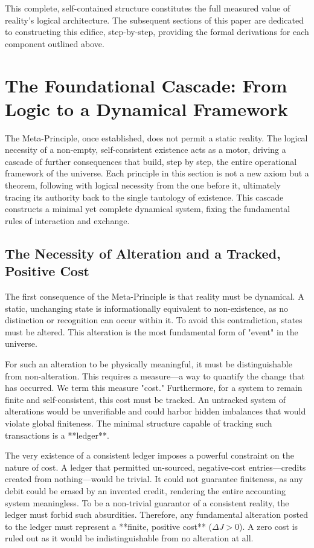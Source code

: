 This complete, self-contained structure constitutes the full measured value of reality's logical architecture. The subsequent sections of this paper are dedicated to constructing this edifice, step-by-step, providing the formal derivations for each component outlined above.

\section{The Foundational Cascade: From Logic to a Dynamical Framework}

The Meta-Principle, once established, does not permit a static reality. The logical necessity of a non-empty, self-consistent existence acts as a motor, driving a cascade of further consequences that build, step by step, the entire operational framework of the universe. Each principle in this section is not a new axiom but a theorem, following with logical necessity from the one before it, ultimately tracing its authority back to the single tautology of existence. This cascade constructs a minimal yet complete dynamical system, fixing the fundamental rules of interaction and exchange.

\subsection{The Necessity of Alteration and a Tracked, Positive Cost}
The first consequence of the Meta-Principle is that reality must be dynamical. A static, unchanging state is informationally equivalent to non-existence, as no distinction or recognition can occur within it. To avoid this contradiction, states must be altered. This alteration is the most fundamental form of "event" in the universe.

For such an alteration to be physically meaningful, it must be distinguishable from non-alteration. This requires a measure—a way to quantify the change that has occurred. We term this measure "cost." Furthermore, for a system to remain finite and self-consistent, this cost must be tracked. An untracked system of alterations would be unverifiable and could harbor hidden imbalances that would violate global finiteness. The minimal structure capable of tracking such transactions is a **ledger**.

The very existence of a consistent ledger imposes a powerful constraint on the nature of cost. A ledger that permitted un-sourced, negative-cost entries—credits created from nothing—would be trivial. It could not guarantee finiteness, as any debit could be erased by an invented credit, rendering the entire accounting system meaningless. To be a non-trivial guarantor of a consistent reality, the ledger must forbid such absurdities. Therefore, any fundamental alteration posted to the ledger must represent a **finite, positive cost** (\(\Delta J > 0\)). A zero cost is ruled out as it would be indistinguishable from no alteration at all.

